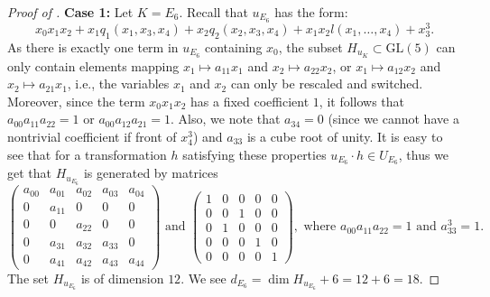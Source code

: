 \documentclass[12pt]{amsart}
\numberwithin{equation}{section}
\theoremstyle{plain}
\theoremstyle{remark}
\theoremstyle{definition}
\newcommand{\GL}{\mathrm{GL}}
\begin{document}
\begin{proof}[Proof of ]
      \smallskip
      
    \noindent\textbf{Case 1: }Let $K=E_6$. Recall that $u_{E_6}$ has the form:
    \[
        x_0x_1x_2+x_1q_1(x_1,x_3,x_4)+ x_2q_2(x_2,x_3,x_4)+x_1x_2l(x_1,\ldots,x_4)+x_3^3.
    \]
    As there is exactly one term in $u_{E_6}$ containing $x_0$, the subset $H_{u_K}\subset \GL(5)$ can only contain elements mapping $x_1\mapsto a_{11}x_1$ and $x_2\mapsto a_{22}x_2$, or $x_1\mapsto a_{12}x_2$ and $x_2\mapsto a_{21}x_1$, i.e., the variables $x_1$ and $x_2$ can only be rescaled and switched. 
    Moreover, since the term $x_0x_1x_2$ has a fixed coefficient $1$, it follows that $a_{00}a_{11}a_{22}=1$ or $a_{00}a_{12}a_{21}=1$. 
    Also, we note that $a_{34}=0$ (since we cannot have a nontrivial coefficient if front of $x_4^3$) and $a_{33}$ is a cube root of unity. 
    It is easy to see that for a transformation $h$ satisfying these properties $u_{E_6}\cdot h\in U_{E_6}$, thus we get that $H_{u_{E_6}}$ is generated by matrices    
    $$
    \begin{pmatrix}
        a_{00} & a_{01} & a_{02} & a_{03} & a_{04}\\
             0 & a_{11} &      0 &      0 &      0\\
             0 &      0 & a_{22} &      0 &      0\\
             0 & a_{31} & a_{32} & a_{33} &      0\\
             0 & a_{41} & a_{42} & a_{43} & a_{44}
    \end{pmatrix} \text{ and }
    \begin{pmatrix}
             1 &      0 &      0 &      0 &      0\\
             0 &      0 &      1 &      0 &      0\\
             0 &      1 &      0 &      0 &      0\\
             0 &      0 &      0 &      1 &      0\\
             0 &      0 &      0 &      0 &      1
    \end{pmatrix}, \text{ where } a_{00}a_{11}a_{22}=1 \text{ and } a_{33}^3=1.
    $$
    The set $H_{u_{E_6}}$ is of dimension $12$. We see $d_{E_6}=\dim H_{u_{E_6}}+6=12+6=18$.

    \medskip    


\end{proof}
\end{document}
